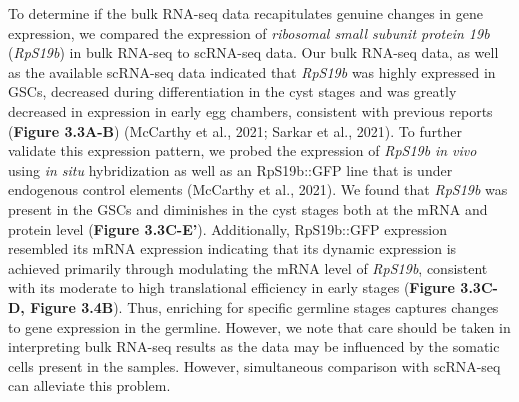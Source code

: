 \documentclass[12pt,oneside]{reedthesis}
\begin{document}
To determine if the bulk RNA-seq data recapitulates genuine changes in
gene expression, we compared the expression of \emph{ribosomal small subunit
protein 19b} (\emph{RpS19b}) in bulk RNA-seq to scRNA-seq data. Our bulk
RNA-seq data, as well as the available scRNA-seq data indicated that
\emph{RpS19b} was highly expressed in GSCs, decreased during differentiation
in the cyst stages and was greatly decreased in expression in early egg
chambers, consistent with previous reports (\textbf{Figure 3.3A-B})
(McCarthy et al., 2021; Sarkar et al., 2021). To further validate this
expression pattern, we probed the expression of \emph{RpS19b} \emph{in vivo} using
\emph{in situ} hybridization as well as an RpS19b::GFP line that is under
endogenous control elements (McCarthy et al., 2021). We
found that \emph{RpS19b} was present in the GSCs and diminishes in the cyst
stages both at the mRNA and protein level (\textbf{Figure 3.3C-E'}).
Additionally, RpS19b::GFP expression resembled its mRNA expression
indicating that its dynamic expression is achieved primarily through
modulating the mRNA level of \emph{RpS19b}, consistent with its moderate to
high translational efficiency in early stages (\textbf{Figure 3.3C-D, Figure 3.4B}). Thus, enriching for specific germline stages
captures changes to gene expression in the germline. However, we note
that care should be taken in interpreting bulk RNA-seq results as the
data may be influenced by the somatic cells present in the samples.
However, simultaneous comparison with scRNA-seq can alleviate this
problem.
\end{document}
